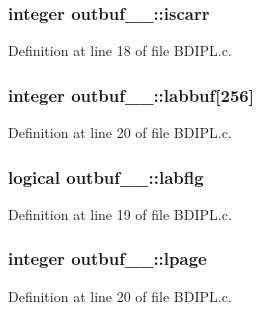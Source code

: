 \subsubsection[{\texorpdfstring{iscarr}{iscarr}}]{\setlength{\rightskip}{0pt plus 5cm}integer outbuf\+\_\+\_\+\+::iscarr}\hypertarget{structoutbuf__1___ad498812091931fecc1b4139c6209950a}{}\label{structoutbuf__1___ad498812091931fecc1b4139c6209950a}


Definition at line 18 of file B\+D\+I\+P\+L.\+c.

\subsubsection[{\texorpdfstring{labbuf}{labbuf}}]{\setlength{\rightskip}{0pt plus 5cm}integer outbuf\+\_\+\_\+\+::labbuf\mbox{[}256\mbox{]}}\hypertarget{structoutbuf__1___a9213c06cf8b8ce3080bf96efd6fcebdd}{}\label{structoutbuf__1___a9213c06cf8b8ce3080bf96efd6fcebdd}


Definition at line 20 of file B\+D\+I\+P\+L.\+c.

\subsubsection[{\texorpdfstring{labflg}{labflg}}]{\setlength{\rightskip}{0pt plus 5cm}logical outbuf\+\_\+\_\+\+::labflg}\hypertarget{structoutbuf__1___a9eb581af4d83597c1c878efd84d46849}{}\label{structoutbuf__1___a9eb581af4d83597c1c878efd84d46849}


Definition at line 19 of file B\+D\+I\+P\+L.\+c.

\subsubsection[{\texorpdfstring{lpage}{lpage}}]{\setlength{\rightskip}{0pt plus 5cm}integer outbuf\+\_\+\_\+\+::lpage}\hypertarget{structoutbuf__1___a04d320f6c200a362b93f57cf310cfa20}{}\label{structoutbuf__1___a04d320f6c200a362b93f57cf310cfa20}


Definition at line 20 of file B\+D\+I\+P\+L.\+c.

